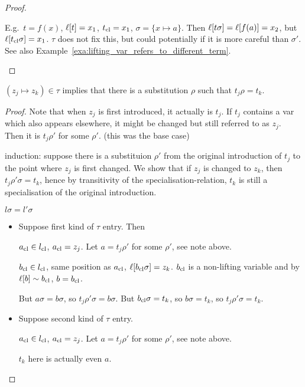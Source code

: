 \documentclass[,%
	paper=a4,%
	DIV12, %
	twoside=false,%
	liststotoc,
	bibtotoc,
	draft=false,%
	numbers=noendperiod
]{scrartcl}
\begin{document}
\begin{proof}
\begin{itemize}
\begin{compactitem}
{					E.g.\ $t = f(x)$, $\ell[t] = x_1$, $t_\mathrm{cl} = x_1$, $\sigma = \{x\mapsto a\}$. 
					Then $\ell[t\sigma] = \ell[f(a)] = x_2$, but $\ell[t_\mathrm{cl}\sigma] = x_1$.
					$\tau$ does not fix this, but could potentially if it is more careful than $\sigma'$.
					See also Example~\ref{exa:lifting_var_refers_to_different_term}.
				}

				\end{compactitem}
	\end{itemize}
\end{proof}


\begin{changebar}
\begin{lemma}
	\label{lemma:tau_is_specialisation}
	$(z_j \mapsto z_k) \in \tau$ implies that there is a substitution $\rho$ such that $t_j \rho = t_k$.
\end{lemma}
\begin{proof}
	Note that when $z_j$ is first introduced, it actually is $t_j$. 
	If $t_j$ contains a var which also appears elsewhere, it might be changed but still referred to as $z_j$. Then it is $t_j\rho'$ for some $\rho'$.
	(this was the base case)

	induction:
	suppose there is a substituion $\rho'$ from the original introduction of $t_j$ to the point where $z_j$ is first changed.
	We show that if $z_j$ is changed to $z_k$, then $t_j\rho'\sigma = t_k$, hence by transitivity of the specialisation-relation, $t_k$ is still a specialisation of the original introduction.
	
	$l\sigma = l'\sigma$

	\begin{itemize}
		\item Suppose first kind of $\tau$ entry.
			Then 

			$a_\mathrm{cl} \in l_\mathrm{cl}$, $a_\mathrm{cl}=z_j$. Let $a=t_j\rho'$ for some $\rho'$, see note above.

			$b_\mathrm{cl} \in l_\mathrm{cl}$, same position as $a_\mathrm{cl}$, $\ell[b_\mathrm{cl}\sigma] = z_k$. $b_\mathrm{cl}$ is a non-lifting variable and by $\ell[b] \sim b_\mathrm{cl}$, $b=b_\mathrm{cl}$.

			But $a\sigma = b\sigma$, so $t_j\rho'\sigma = b\sigma$.
			But $b_\mathrm{cl} \sigma = t_k$, so $b\sigma = t_k$, so $t_j\rho'\sigma = t_k$.

		\item Suppose second kind of $\tau$ entry.\nopagebreak

			$a_\mathrm{cl} \in l_\mathrm{cl}$, $a_\mathrm{cl}=z_j$. Let $a=t_j\rho'$ for some $\rho'$, see note above.

			$t_k$ here is actually even $a$.
			\qedhere
	\end{itemize}
\end{proof}
\end{changebar}
\end{document}
